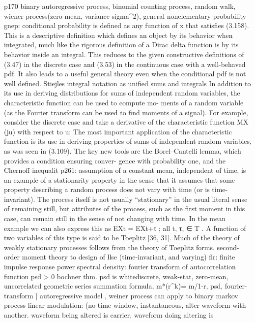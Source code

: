 \documentclass[12pt]{article}
\begin{document}
p170
binary autoregressive process, binomial counting process, random walk, wiener
process(zero-mean, variance sigma^2),
general nonelementary probability
gnep: conditional probability is defined as any function
of x that satisfies (3.158). This is a descriptive definition which defines an
object by its behavior when integrated, much like the rigorous definition of
a Dirac delta function is by its behavior inside an integral. This reduces to
the given constructive definitions of (3.47) in the discrete case and (3.53) in
the continuous case with a well-behaved pdf. It also leads to a useful general
theory even when the conditional pdf is not well defined.
Stiejles integral notation as unified sums and integrals
In addition to its use in deriving distributions for sums of independent
random variables, the characteristic function can be used to compute mo-
ments of a random variable (as the Fourier transform can be used to find
moments of a signal). For example, consider the discrete case and take a
derivative of the characteristic function MX (ju) with respect to u:
The most important application of the characteristic function is its use in
deriving properties of sums of independent random variables, as was seen in
(3.109).
The key new tools
are the Borel–Cantelli lemma, which provides a condition ensuring conver-
gence with probability one, and the Chernoff inequalit
p261:
assumption of a constant mean, independent of time, is an example
of a stationarity property in the sense that it assumes that some property
describing a random process does not vary with time (or is time-invariant).
The process itself is not usually “stationary” in the usual literal sense of
remaining still, but attributes of the process, such as the first moment in
this case, can remain still in the sense of not changing with time. In the
mean example we can also express this as
EXt = EXt+τ ; all t, τ,
 ∈ T . A function of two variables of this type is
said to be Toeplitz [36, 31]. Much of the theory of weakly stationary processes
follows from the theory of Toeplitz forms.
second-order moment theory to design of llse (time-invariant, and varying)
fir: finite impulse response
power spectral density: fourier transform of autocorrelation function
psd > 0 bochner thm. psd is white{discrete, weak-stat, zero-mean,
  uncorrelated}
geometric series summation formula, m*\sigma(r^k)= m/1-r, psd,
fourier-transform | autoregressive model , weiner process
can apply to binary markov process
linear modulation: (no time window, instantaneous, alter waveform with
another. waveform being altered is carrier, waveform doing altering is
\end{document}

